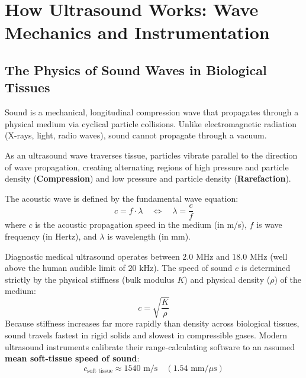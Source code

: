 \documentclass[11pt,a4paper]{article}
\begin{document}
\section{How Ultrasound Works: Wave Mechanics and Instrumentation}

\subsection{The Physics of Sound Waves in Biological Tissues}
Sound is a mechanical, longitudinal compression wave that propagates through a physical medium via cyclical particle collisions. Unlike electromagnetic radiation (X-rays, light, radio waves), sound cannot propagate through a vacuum.

As an ultrasound wave traverses tissue, particles vibrate parallel to the direction of wave propagation, creating alternating regions of high pressure and particle density (\textbf{Compression}) and low pressure and particle density (\textbf{Rarefaction}).

The acoustic wave is defined by the fundamental wave equation:
\begin{equation}
    c = f \cdot \lambda \quad \iff \quad \lambda = \frac{c}{f}
\end{equation}
where $c$ is the acoustic propagation speed in the medium (in m/s), $f$ is wave frequency (in Hertz), and $\lambda$ is wavelength (in mm).

\begin{physicsoverview}
Diagnostic medical ultrasound operates between $2.0\text{ MHz}$ and $18.0\text{ MHz}$ (well above the human audible limit of $20\text{ kHz}$). The speed of sound $c$ is determined strictly by the physical stiffness (bulk modulus $K$) and physical density ($\rho$) of the medium:
\begin{equation}
    c = \sqrt{\frac{K}{\rho}}
\end{equation}
Because stiffness increases far more rapidly than density across biological tissues, sound travels fastest in rigid solids and slowest in compressible gases. Modern ultrasound instruments calibrate their range-calculating software to an assumed \textbf{mean soft-tissue speed of sound}:
\begin{equation}
    c_{\text{soft tissue}} \approx 1540\text{ m/s} \quad (1.54\text{ mm}/\mu\text{s})
\end{equation}
\end{physicsoverview}
\end{document}
